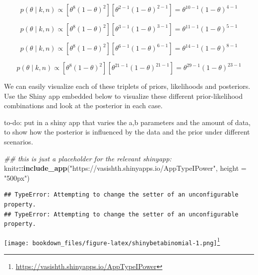 \documentclass[12pt,]{krantz}
\makeatletter
\newenvironment{Shaded}{\begin{snugshade}}{\end{snugshade}}
\newcommand{\CommentTok}[1]{\textcolor[rgb]{0.56,0.35,0.01}{\textit{#1}}}
\newcommand{\DataTypeTok}[1]{\textcolor[rgb]{0.13,0.29,0.53}{#1}}
\newcommand{\KeywordTok}[1]{\textcolor[rgb]{0.13,0.29,0.53}{\textbf{#1}}}
\newcommand{\NormalTok}[1]{#1}
\newcommand{\OperatorTok}[1]{\textcolor[rgb]{0.81,0.36,0.00}{\textbf{#1}}}
\newcommand{\StringTok}[1]{\textcolor[rgb]{0.31,0.60,0.02}{#1}}
\renewcommand{\href}[2]{#2\footnote{\url{#1}}}
\newenvironment{kframe}{%
\medskip{}
\setlength{\fboxsep}{.8em}
 \def\at@end@of@kframe{}%
 \ifinner\ifhmode%
  \def\at@end@of@kframe{\end{minipage}}%
  \begin{minipage}{\columnwidth}%
 \fi\fi%
 \def\FrameCommand##1{\hskip\@totalleftmargin \hskip-\fboxsep
 \colorbox{shadecolor}{##1}\hskip-\fboxsep
     \hskip-\linewidth \hskip-\@totalleftmargin \hskip\columnwidth}%
 \MakeFramed {\advance\hsize-\width
   \@totalleftmargin\z@ \linewidth\hsize
   \@setminipage}}%
 {\par\unskip\endMakeFramed%
 \at@end@of@kframe}
\newenvironment{rmdblock}[1]
  {
  \begin{itemize}
  \renewcommand{\labelitemi}{
    \raisebox{-.7\height}[0pt][0pt]{
      {\setkeys{Gin}{width=3em,keepaspectratio}\texttt{[image: images/\#1]}}
    }
  }
  \setlength{\fboxsep}{1em}
  \begin{kframe}
  \item
  }
  {
  \end{kframe}
  \end{itemize}
  }
\newenvironment{rmdnote}
  {\begin{rmdblock}{note}}
  {\end{rmdblock}}
\theoremstyle{definition}
\theoremstyle{definition}
\theoremstyle{definition}
\theoremstyle{remark}
\makeatother
\begin{document}
\begin{equation}
p(\theta\mid k,n) \propto [\theta^{8} (1-\theta)^{2}] [\theta^{2-1}(1-\theta)^{2-1}] = \theta^{10-1} (1-\theta)^{4-1}
\end{equation}

\begin{equation}
p(\theta\mid k,n) \propto [\theta^{8} (1-\theta)^{2}] [\theta^{3-1}(1-\theta)^{3-1}] = \theta^{11-1} (1-\theta)^{5-1}
\end{equation}

\begin{equation}
p(\theta\mid k,n) \propto [\theta^{8} (1-\theta)^{2}] [\theta^{6-1}(1-\theta)^{6-1}] = \theta^{14-1} (1-\theta)^{8-1}
\end{equation}

\begin{equation}
p(\theta\mid k,n) \propto [\theta^{8} (1-\theta)^{2}] [\theta^{21-1}(1-\theta)^{21-1}] = \theta^{29-1} (1-\theta)^{23-1}
\end{equation}

We can easily visualize each of these triplets of priors, likelihoods and posteriors. Use the Shiny app embedded below to visualize these different prior-likelihood combinations and look at the posterior in each case.

\begin{rmdnote}
to-do: put in a shiny app that varies the a,b parameters and the amount of data, to show how the posterior is influenced by the data and the prior under different scenarios.
\end{rmdnote}

\begin{Shaded}
\begin{Highlighting}[]
\CommentTok{## this is just  a placeholder for the relevant shinyapp:}
\NormalTok{knitr}\OperatorTok{::}\KeywordTok{include_app}\NormalTok{(}\StringTok{"https://vasishth.shinyapps.io/AppTypeIPower"}\NormalTok{, }
  \DataTypeTok{height =} \StringTok{"500px"}\NormalTok{)}
\end{Highlighting}
\end{Shaded}

\begin{verbatim}
## TypeError: Attempting to change the setter of an unconfigurable property.
## TypeError: Attempting to change the setter of an unconfigurable property.
\end{verbatim}

\href{https://vasishth.shinyapps.io/AppTypeIPower}{\texttt{[image: bookdown\_files/figure-latex/shinybetabinomial-1.png]}}
\end{document}
